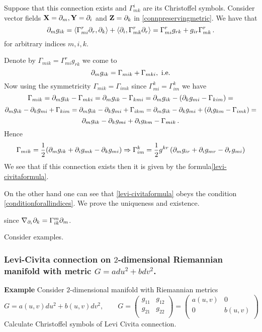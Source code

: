 \documentclass[12pt]{article}
\theoremstyle{theorem}
\numberwithin{equation}{section}
\begin{document}
{\small Suppose that this connection exists and $\Gamma^i_{mk}$ are its Christoffel symbols.
 Consider vector fields ${\bf X}=\partial_m,{\bf Y}=\partial_i$ and ${\bf Z}=\partial_k$ in \eqref{connpreservingmetric}.
  We have that
            \begin{equation}\label{conditionforallindices}
         \partial_mg_{ik}=\langle\Gamma_{mi}^r\partial_r,\partial_k\rangle+\langle\partial_i,\Gamma^r_{mk}\partial_r\rangle=
              \Gamma^r_{mi}g_{rk}+g_{ir}\Gamma^r_{mk}\,.
            \end{equation}
   for arbitrary indices $m,i,k$.

    Denote by $\Gamma_{mik}=\Gamma^r_{mi}g_{rk}$ we come to
                $$
          \partial_mg_{ik}=\Gamma_{mik}+\Gamma_{mki}, \,\,{\rm i.e.}
                $$
    Now using the symmetricity $\Gamma_{mik}=\Gamma_{imk}$ since $\Gamma_{mi}^k=\Gamma_{im}^k$ we have
                $$
    \Gamma_{mik}=\partial_mg_{ik}-\Gamma_{mki}=\partial_mg_{ik}-\Gamma_{kmi}=\partial_mg_{ik}-\left(\partial_kg_{mi}-\Gamma_{kim}\right)=
                $$
                $$
\partial_mg_{ik}-\partial_kg_{mi}+\Gamma_{kim}=\partial_mg_{ik}-\partial_kg_{mi}+\Gamma_{ikm}=
\partial_mg_{ik}-\partial_kg_{mi}+\left(\partial_ig_{km}-\Gamma_{imk}\right)=
                $$
                $$
       \partial_mg_{ik}-\partial_kg_{mi}+\partial_ig_{km}-\Gamma_{mik}\,.
                $$
 Hence
                \begin{equation}\label{levi-vivitaforlowerindices}
   \Gamma_{mik}={1\over 2}(\partial_mg_{ik}+\partial_ig_{mk}-\partial_kg_{mi})\Rightarrow \Gamma^k_{im}=
   {1\over 2}g^{kr}\left(\partial_mg_{ir}+\partial_ig_{mr}-\partial_rg_{mi}\right)
                \end{equation}
  We see that if this connection exists then it is given by the formula\eqref{levi-civitaformula}.

  On the other hand one can see that \eqref{levi-civitaformula} obeys the condition
  \eqref{conditionforallindices}. We prove the uniqueness and existence.

since $\nabla_{\partial_i}\partial_k=\Gamma_{ik}^m\partial_m$.}

\m

Consider examples.

\m

\subsubsection {Levi-Civita connection on $2$-dimensional Riemannian
manifold with metric $G=adu^2+bdv^2$.}

{\bf Example} Consider $2$-dimensional manifold with Riemannian metrics
                  $$
                  G=a(u,v)du^2+b(u,v)dv^2, \qquad
                  G=\begin{pmatrix}
                       g_{11} &g_{12}\\
                       g_{21}  &g_{22}\\
                     \end{pmatrix}=
         \begin{pmatrix}
                       a(u,v) &0\\
                       0  &b(u,v)\\
                     \end{pmatrix}
                  $$
Calculate Christoffel symbols of Levi Civita connection.
\end{document}
